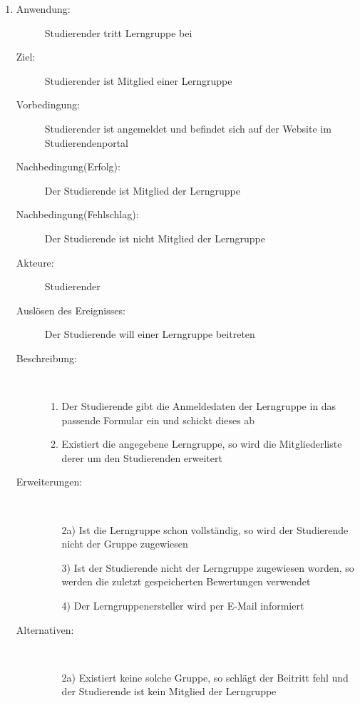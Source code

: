 \documentclass[parskip=full]{scrartcl}
\newcommand{\swtLabel}[1]{\textbf{/#1\arabic*0/}}
\begin{document}
\begin{enumerate}[label=\swtLabel{S}]
  
  \item
  \begin{description}
  \item[Anwendung:] Studierender tritt Lerngruppe bei
  \item[Ziel:] Studierender ist Mitglied einer Lerngruppe
  	\item[Vorbedingung:] Studierender ist angemeldet und befindet sich auf der
  	Website im Studierendenportal
  	\item[Nachbedingung(Erfolg):] Der Studierende ist Mitglied der Lerngruppe
  	\item[Nachbedingung(Fehlschlag):] Der Studierende ist nicht Mitglied der
  	Lerngruppe
  	\item[Akteure:] Studierender
  	\item[Auslösen des Ereignisses:] Der Studierende will einer Lerngruppe beitreten
  	\item[Beschreibung:]~
  	\begin{enumerate}
  	  \item Der Studierende gibt die Anmeldedaten der Lerngruppe in das passende
  	  Formular ein und schickt dieses ab
  	  \item Existiert die angegebene Lerngruppe, so wird die Mitgliederliste
  	  derer um den Studierenden erweitert
  	\end{enumerate}
  	\item[Erweiterungen:]~
  	\begin{enumerate}
  	  \item[2a)] Ist die Lerngruppe schon vollständig, so wird der Studierende nicht
  	  der Gruppe zugewiesen
  	  \item[3)] Ist der Studierende nicht der Lerngruppe zugewiesen worden, so werden
  	  die zuletzt gespeicherten Bewertungen verwendet
  	  \item[4)] Der Lerngruppenersteller wird per E-Mail informiert
  	 \end{enumerate}
  	\item[Alternativen:] ~
  	\begin{enumerate}
  	  \item[2a)] Existiert keine solche Gruppe, so schlägt der Beitritt fehl und
  	  der Studierende ist kein Mitglied der Lerngruppe
  	 \end{enumerate}  
  \end{description}
%   
  

\end{enumerate}
\end{document}

